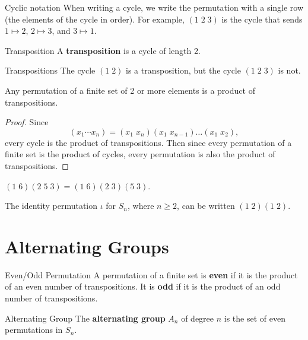 \documentclass[10pt]{report}
\begin{document}
\begin{note}{Cyclic notation}{}
	When writing a cycle, we write the permutation with a single row (the elements of the cycle in order). For example, $(1\;2\;3)$ is the cycle that sends $1\mapsto 2$, $2\mapsto 3$, and $3\mapsto 1$.
\end{note}

\begin{defn}{Transposition}{}
A \textbf{transposition} is a cycle of length 2.
\end{defn}

\begin{ex}{Transpositions}{}
	The cycle $(1\;2)$ is a transposition, but the cycle $(1\;2\;3)$ is not.
\end{ex}

\begin{cor}
	Any permutation of a finite set of 2 or more elements is a product of transpositions.
\end{cor}
\begin{proof}
	Since
	\[
		(x_1 \cdots x_n) = (x_1\;x_n) (x_1\;x_{n-1}) \dots (x_1\;x_2),
	\] every cycle is the product of transpositions. Then since every permutation of a finite set is the product of cycles, every permutation is also the product of transpositions.
\end{proof}

\begin{ex}{}{}
	$(1\;6)(2\;5\;3) = (1\;6)(2\;3)(5\;3)$.
\end{ex}

\begin{ex}{}{}
	The identity permutation $\iota$ for $S_n$, where $n \geq 2$, can be written $(1\;2)(1\;2)$.
\end{ex}


\section{Alternating Groups}

\begin{defn}{Even/Odd Permutation}{}
	A permutation of a finite set is \textbf{even} if it is the product of an even number of transpositions. It is \textbf{odd} if it is the product of an odd number of transpositions.
\end{defn}

\begin{defn}{Alternating Group}{}
The \textbf{alternating group} $A_n$ of degree $n$ is the set of even permutations in $S_n$.
\end{defn}
\end{document}
